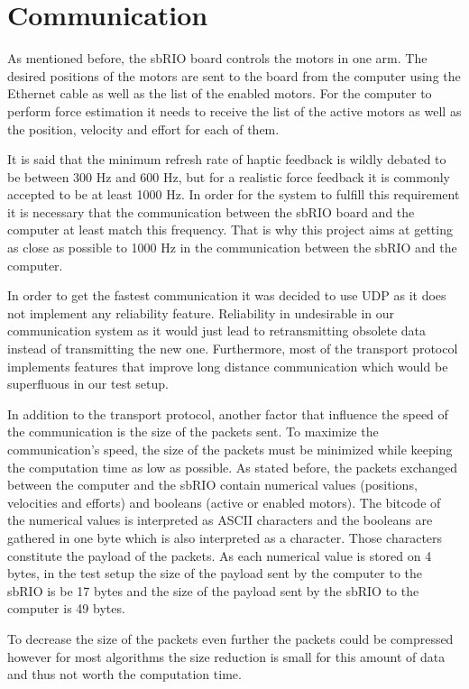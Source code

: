 \section{Communication}

As mentioned before, the sbRIO board controls the motors in one arm. The desired positions of the motors are sent to the board from the computer using the Ethernet cable as well as the list of the enabled motors. For the computer to perform force estimation it needs to receive the list of the active motors as well as the position, velocity and effort for each of them.

It is said that the minimum refresh rate of haptic feedback is wildly debated to
be between 300 Hz and 600 Hz, but for a realistic force feedback it is commonly accepted
to be at least 1000 Hz\cite{coles2011role}. In order for the system to fulfill this requirement it is necessary that the communication between the sbRIO board and the computer at least match this frequency. That is why this project aims at getting as close as possible to 1000 Hz in the communication between the sbRIO and the computer.

In order to get the fastest communication it was decided to use UDP as it does not implement any reliability feature. Reliability in undesirable in our communication system as it would just lead to retransmitting obsolete data instead of transmitting the new one. Furthermore, most of the transport protocol implements features that improve long distance communication which would be superfluous in our test setup. 
 
In addition to the transport protocol, another factor that influence the speed of the communication is the size of the packets sent. To maximize the communication's speed, the size of the packets must be minimized while keeping the computation time as low as possible. As stated before, the packets exchanged between the computer and the sbRIO contain numerical values (positions, velocities and efforts) and booleans (active or enabled motors). The bitcode of the numerical values is interpreted as ASCII characters and the booleans are gathered in one byte which is also interpreted as a character. Those characters constitute the payload of the packets. As each numerical value is stored on 4 bytes, in the test setup the size of the payload sent by the computer to the sbRIO is be 17 bytes and the size of the payload sent by the sbRIO to the computer is 49 bytes.

To decrease the size of the packets even further the packets could be compressed however for most algorithms the size reduction is small for this amount of data and thus not worth the computation time.

